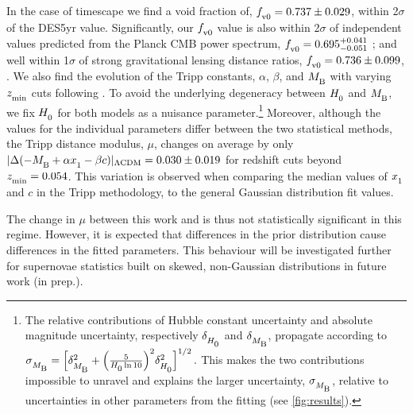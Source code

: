 \documentclass[fleqn,usenatbib,onecolumn,referee]{mnras}
\newcommand{\Z}[1]{_{\lower2pt\hbox{$\scriptstyle#1$}}}
\newcommand{\Ns}[1]{_{\lower2pt\hbox{$\scriptstyle\rm#1$}}}
\newcommand{\Hn}{H\Z0}
\begin{document}
In the case of timescape we find a void fraction of, $f\Ns{v0} = 0.737 \pm 0.029$, within 2$\sigma$ of the \citet{Camilleri_2024} DES5yr value. Significantly, our $f\Ns{v0}$ value is also within 2$\sigma$ of independent values predicted from the Planck CMB power spectrum, $f\Ns{v0} = 0.695^{+0.041}_{-0.051}$ \citep{Duley_2013}; and well within 1$\sigma$ of strong gravitational lensing distance ratios, $f\Ns{v0} = 0.736 \pm 0.099$, \citep{HarveyHawes_2024}. We also find the evolution of the Tripp constants, $\alpha$, $\beta$, and $M\Ns{B}$ with varying $z\Ns{min}$ cuts following \citet{Dam_2017, Lane_2023}. To avoid the underlying degeneracy between $\Hn$ and $M\Ns{B}$, we fix $\Hn$ for both models as a nuisance parameter.\footnote{The relative contributions of Hubble constant uncertainty and absolute magnitude uncertainty, respectively $\delta\Z{\Hn}$ and $\delta\Z{M\Ns{B}}$, propagate according to
  $ \sigma\Z{M\Ns{B}} = \Bigl[\delta\Z{M\Ns{B}}^2 + \Bigl( \frac{5}{\Hn \ln{10}} \Bigr)^2 \delta\Z{\Hn}^2\Bigr]^{1/2}\,.$
This makes the two contributions impossible to unravel and explains the larger uncertainty, $\sigma\Z{M\Ns{B}}$,
relative to uncertainties in other parameters from the fitting (see \cref{fig:results}).} Moreover, although the values for the individual parameters differ between the two statistical methods, the Tripp distance modulus, $\mu$, changes on average by only $| \Delta (- M \Ns{B} + \alpha x\Z1 - \beta c) |_{\rm \Lambda CDM} = 0.030 \pm 0.019$ for redshift cuts beyond $z \Ns {min}=0.054$. This variation is observed when comparing the median values of $x\Z 1$ and $c$ in the Tripp methodology, to the general Gaussian distribution fit values.

The change in $\mu$ between this work and \citet{Lane_2023} is thus not statistically significant in this regime. However, it is expected that differences in the prior distribution cause differences in the fitted parameters. This behaviour will be investigated further for supernovae statistics built on skewed, non-Gaussian distributions in future work (in prep.).
\end{document}
